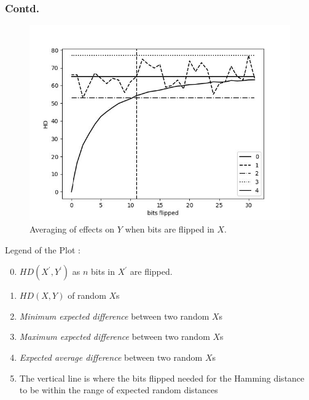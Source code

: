 \begin{frame}
\frametitle{Contd.}

\setlength{\columnsep}{10pt}
\begin{multicols}{2}
\setlength{\leftmargin}{1pt}
\setlength{\rightmargin}{0pt}
\begin{figure}
    \centering
    \includegraphics[scale=0.55]{fig2.jpg}
    \caption{Averaging of effects on $Y$ when bits are 
flipped in $X$.}
\end{figure}

\columnbreak
Legend of the Plot : 
\begin{enumerate}
    \setcounter{enumi}{-1} %
    \item \footnotesize{$HD(X^\prime, Y^\prime)$ as $n$ bits in $X^\prime$ are flipped.}
    \item \footnotesize{$HD(X,Y)$ of random $X$s}
    \item \footnotesize{\textit{Minimum expected difference} between two random $X$s}
    \item \footnotesize{\textit{Maximum expected difference} between two random $X$s}
    \item \footnotesize{\textit{Expected average difference} between two random $X$s}
    \item[] \footnotesize{The vertical line is where the bits flipped needed for the Hamming distance to be within the range of expected random distances}
\end{enumerate}
\end{multicols}
\end{frame}